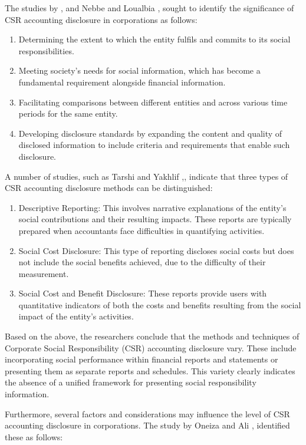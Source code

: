 \documentclass[10pt]{NSP1}
\begin{document}
The studies by \cite{ref23}, and Nebbe and Loualbia \cite{ref24}, sought to identify the significance of CSR accounting disclosure in corporations as follows:

\begin{enumerate}
  \item Determining the extent to which the entity fulfils and commits to its social responsibilities.
  \item Meeting society's needs for social information, which has become a fundamental requirement alongside financial information.
  \item Facilitating comparisons between different entities and across various time periods for the same entity.
  \item Developing disclosure standards by expanding the content and quality of disclosed information to include criteria and requirements that enable such disclosure.
\end{enumerate}

A number of studies, such as Tarshi and Yakhlif \cite{ref4},, indicate that three types of CSR accounting disclosure methods can be distinguished:

\begin{enumerate}
  \item Descriptive Reporting: This involves narrative explanations of the entity's social contributions and their resulting impacts. These reports are typically prepared when accountants face difficulties in quantifying activities.
  \item Social Cost Disclosure: This type of reporting discloses social costs but does not include the social benefits achieved, due to the difficulty of their measurement.
  \item Social Cost and Benefit Disclosure: These reports provide users with quantitative indicators of both the costs and benefits resulting from the social impact of the entity's activities.
\end{enumerate}

Based on the above, the researchers conclude that the methods and techniques of Corporate Social Responsibility (CSR) accounting disclosure vary. These include incorporating social performance within financial reports and statements or presenting them as separate reports and schedules. This variety clearly indicates the absence of a unified framework for presenting social responsibility information.

Furthermore, several factors and considerations may influence the level of CSR accounting disclosure in corporations. The study by Oneiza and Ali \cite{ref26}, identified these as follows:
\end{document}
